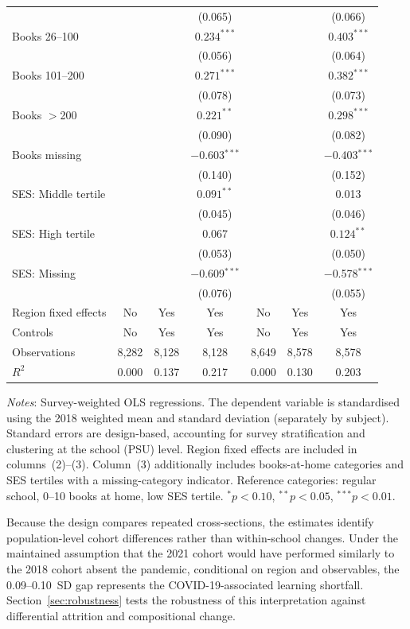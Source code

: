 \begin{table}[htbp]
{\begin{tabular}{lcccccc}
  & & & (0.065)     & & & (0.066) \\
Books 26--100
  & & & $0.234^{***}$ & & & $0.403^{***}$ \\
  & & & (0.056)      & & & (0.064) \\
Books 101--200
  & & & $0.271^{***}$ & & & $0.382^{***}$ \\
  & & & (0.078)      & & & (0.073) \\
Books $>$200
  & & & $0.221^{**}$ & & & $0.298^{***}$ \\
  & & & (0.090)     & & & (0.082) \\
Books missing
  & & & $-$0.603$^{***}$ & & & $-$0.403$^{***}$ \\
  & & & (0.140)         & & & (0.152) \\
\addlinespace
SES: Middle tertile
  & & & $0.091^{**}$ & & & 0.013 \\
  & & & (0.045)     & & & (0.046) \\
SES: High tertile
  & & & 0.067        & & & $0.124^{**}$ \\
  & & & (0.053)      & & & (0.050) \\
SES: Missing
  & & & $-$0.609$^{***}$ & & & $-$0.578$^{***}$ \\
  & & & (0.076)         & & & (0.055) \\
\addlinespace
Region fixed effects & No & Yes & Yes & No & Yes & Yes \\
Controls             & No & Yes & Yes & No & Yes & Yes \\
\midrule
Observations & 8,282 & 8,128 & 8,128 & 8,649 & 8,578 & 8,578 \\
$R^2$        & 0.000 & 0.137 & 0.217 & 0.000 & 0.130 & 0.203 \\
\bottomrule
\end{tabular}}%
\begin{tablenotes}
\small
\item \textit{Notes}: Survey-weighted OLS regressions. The dependent variable is
standardised using the 2018 weighted mean and standard deviation (separately by
subject). Standard errors are design-based, accounting for survey stratification
and clustering at the school (PSU) level. Region fixed effects are included in
columns~(2)--(3). Column~(3) additionally includes books-at-home categories and
SES tertiles with a missing-category indicator. Reference categories: regular
school, 0--10 books at home, low SES tertile.
$^{*}p<0.10$, $^{**}p<0.05$, $^{***}p<0.01$.
\end{tablenotes}
\end{table}

Because the design compares repeated cross-sections, the estimates identify
population-level cohort differences rather than within-school changes. Under
the maintained assumption that the 2021 cohort would have performed similarly
to the 2018 cohort absent the pandemic, conditional on region and observables,
the 0.09--0.10~SD gap represents the COVID-19-associated learning shortfall.
Section~\ref{sec:robustness} tests the robustness of this interpretation
against differential attrition and compositional change.
